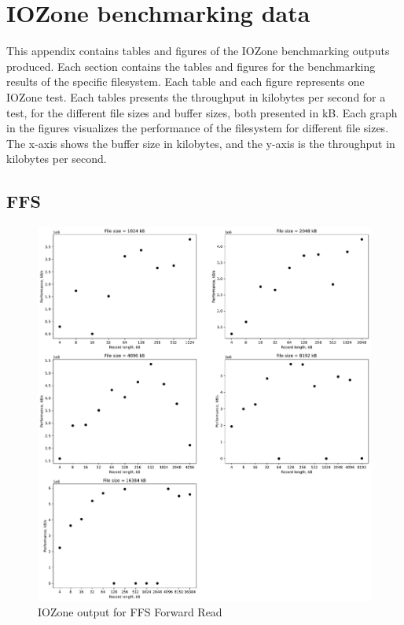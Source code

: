 \chapter{IOZone benchmarking data}
\label{app:bench_data}
This appendix contains tables and figures of the IOZone benchmarking outputs produced. Each section contains the tables and figures for the benchmarking results of the specific filesystem. Each table and each figure represents one IOZone test. Each tables presents the throughput in kilobytes per second for a test, for the different file sizes and buffer sizes, both presented in kB. Each graph in the figures visualizes the performance of the filesystem for different file sizes. The x-axis shows the buffer size in kilobytes, and the y-axis is the throughput in kilobytes per second.

\section{FFS}








\begin{figure}[!htb]
	\label{fig:app_bench_ffs_rnd_read}
	\begin{center}
		\includegraphics[width=1.0\textwidth]{figures/benchmarking/ffs/Read.pdf}
	\end{center}
	\caption{IOZone output for FFS Forward Read}
\end{figure}

